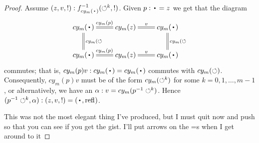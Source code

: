 \begin{example}
\begin{proof}
  Assume $(z,v,!):f_{cy_m(\base)}^{-1}(\Sloop^k,!)$.  Given $p:\base=z$ we get that the diagram
  $$\xymatrix{cy_m(\base)\ar@{=}[r]^{cy_m(p)}\ar@{=}[d]^{cy_m(\Sloop}&cy_m(z)\ar@{=}[r]^-v&cy_m(\base)\ar@{=}[d]^{cy_m(\Sloop}\\
  cy_m(\base)\ar@{=}[r]^{cy_m(p)}&cy_m(z)\ar@{=}[r]^-v&cy_m(\base)}$$
commutes; that is, $cy_m(p)v:cy_m(\base)=cy_m(\base)$ commutes with $cy_m(\circlearrowleft)$.
Consequently, $cy_m(p)v$ must be of the form $cy_m(\circlearrowleft^k)$ for some $k=0,1,\dots,m-1$, or alternatively, we have an $\alpha:v=cy_m(p^{-1}\circlearrowleft^k)$.
Hence $(p^{-1}\Sloop^k,\alpha):(z,v,!)=(\base,\refl{})$.

{\color{red}This was not the most elegant thing I've produced, but I must quit now and push so that you can see if you get the gist.  I'll put arrows on the =s when I get around to it}
\end{proof}





  



\end{example}
